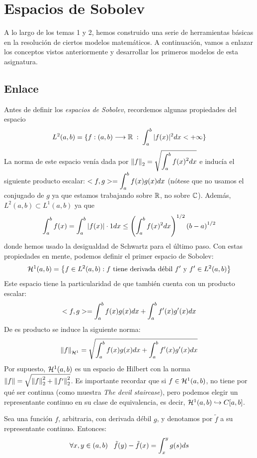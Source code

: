 \chapter{Espacios de Sobolev}

A lo largo de los temas 1 y 2, hemos construido una serie de herramientas básicas en la resolución de ciertos modelos matemáticos. A continuación, vamos a enlazar los conceptos vistos anteriormente y desarrollar los primeros modelos de esta asignatura.

\section{Enlace}

Antes de definir los \textit{espacios de Sobolev}, recordemos algunas propiedades del espacio 
\[L^2(a,b)=\displaystyle\{\funcion{f}{(a,b)}{\R}\;:\; \integral{a}{b}{|f(x)|^2dx<+\infty}\displaystyle\}\]
La norma de este espacio venía dada por $\norm{f}_2=\sqrt{\integral{a}{b}{f(x)^2dx}}$ e inducía el siguiente producto escalar: $<f,g>=\integral{a}{b}{f(x)g(x)dx}$ (nótese que no usamos el conjugado de $g$ ya que estamos trabajando sobre $\R$, no sobre $\C$). Además, $L^2(a,b)\subset L^1(a,b)$ ya que 
\[
\integral{a}{b}{f(x)}=\integral{a}{b}{|f(x)|\cdot 1dx}\leq \left(\integral{a}{b}{f(x)^2dx}\right)^{1/2}\left(b-a\right)^{1/2}
\]
donde hemos usado la desigualdad de Schwartz para el último paso. Con estas propiedades en mente, podemos definir el primer espacio de Sobolev:
\[
\sobolev{1}=\conjunto{f\in\lebesgue{2}: f \text{ tiene derivada débil }f' \text{ y } f'\in\lebesgue{2}}
\]
Este espacio tiene la particularidad de que también cuenta con un producto escalar:
\[
<f,g>=\integral{a}{b}{f(x)g(x)dx}+\integral{a}{b}{f'(x)g'(x)dx}
\]
De es producto se induce la siguiente norma:
\[
\normasobolev{1}{f}=\sqrt{\integral{a}{b}{f(x)g(x)dx}+\integral{a}{b}{f'(x)g'(x)dx}}
\]
Por supuesto, $\sobolev{1}$ es un espacio de Hilbert con la norma $\norm{f}=\sqrt{\norm{f}^2_2+\norm{f'}_2^2}$. Es importante recordar que si $f\in\sobolev{1}$, no tiene por qué ser continua (como muestra \textit{The devil staircase}), pero podemos elegir un representante continuo en su clase de equivalencia, es decir, $\sobolev{1}\hookrightarrow C[a,b]$.
\begin{lemma}
Sea una función $f$, arbitraria, con derivada débil $g$, y denotamos por $\tilde{f}$ a su representante continuo. Entonces:
\[
\forall x,y\in(a,b) \espacio \tilde{f}(y)-\tilde{f}(x)=\integral{x}{y}{g(s)ds}
\]
\end{lemma}
